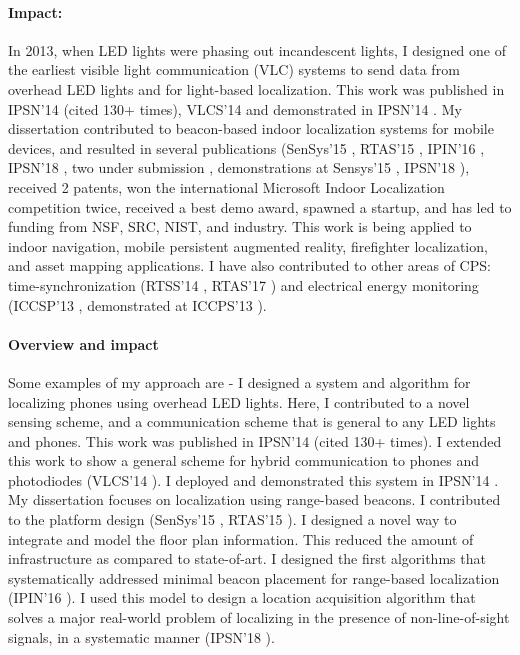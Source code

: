 \documentclass[10pt]{article}
\begin{document}
\paragraph{Impact:}
In 2013, when LED lights were phasing out
incandescent lights, I designed one of the earliest visible light
communication (VLC) systems to send data from overhead LED lights and
for light-based localization. This work was published in IPSN'14\cite{rajagopal2014visual}
(cited 130+ times), VLCS'14 \cite{rajagopal2014hybrid} and demonstrated in IPSN'14 \cite{rajagopal2014demonstration}.  My dissertation contributed to beacon-based indoor localization systems
for mobile devices, and resulted in several publications (SenSys'15 \cite{lazik2015alps},
RTAS'15 \cite{rtas-alps-platform}, IPIN'16 \cite{rajagopal2016beacon}, IPSN'18 \cite{rajagopal2018enhancing}, two under submission \cite{mobileAR, beaconplacementtheory}, demonstrations at
Sensys'15 \cite{lazik2015alpsdemo}, IPSN'18 \cite{rajagopal2018welcome}), received 2 patents, won the international
Microsoft Indoor Localization competition twice, received a best demo
award, spawned a startup, and has led to funding from NSF, SRC, NIST, and
industry. This work is being applied to indoor navigation, mobile
persistent augmented reality, firefighter localization, and asset
mapping applications.  I have also contributed to other areas of CPS:
time-synchronization (RTSS'14 \cite{buevich2013hardware}, RTAS'17 \cite{dongare2017pulsar}) and electrical energy
monitoring (ICCSP'13 \cite{rajagopal2013magnetic}, demonstrated at ICCPS'13 \cite{rajagopal2013demo}).


\paragraph{Overview and impact}
Some examples of my approach are - I designed a system and algorithm for localizing phones using overhead LED lights. Here, I contributed to a novel sensing scheme, and a communication scheme that is general to any LED lights and phones. This work was published in IPSN'14\cite{rajagopal2014visual}
(cited 130+ times). I extended this work to show a general scheme for hybrid communication to phones and photodiodes (VLCS'14 \cite{rajagopal2014hybrid}). I deployed and demonstrated this system in IPSN'14 \cite{rajagopal2014demonstration}. My dissertation focuses on localization using range-based beacons. I contributed to the platform design (SenSys'15 \cite{lazik2015alps},
RTAS'15 \cite{rtas-alps-platform}). I designed a novel way to integrate and model the floor plan information. This reduced the amount of infrastructure as compared to state-of-art. I designed the first algorithms that systematically addressed minimal beacon placement for range-based localization (IPIN'16 \cite{rajagopal2016beacon}). I used this model to design a location acquisition algorithm that solves a major real-world problem of localizing in the presence of non-line-of-sight signals, in a systematic manner (IPSN'18 \cite{rajagopal2018enhancing}). 
\end{document}
